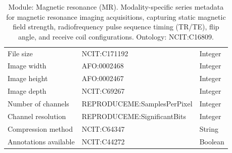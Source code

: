 \documentclass{article}
\begin{document}
\begin{table}[htb]
\begin{tabular}{lll}
File size & NCIT:C171192 & Integer \\
Image width & AFO:0002468 & Integer \\
Image height & AFO:0002467 & Integer \\
Image depth & NCIT:C69267 & Integer \\
Number of channels & REPRODUCEME:SamplesPerPixel & Integer \\
Channel resolution & REPRODUCEME:SignificantBits & Integer \\
Compression method & NCIT:C64347 & String \\
Annotations available & NCIT:C44272 & Boolean \\
\hline
\end{tabular}
\caption[Module: Magnetic resonance (MR)]{\label{table:table17} Module: Magnetic resonance (MR). Modality-specific series metadata for magnetic resonance imaging acquisitions, capturing static magnetic field strength, radiofrequency pulse sequence timing (TR/TE), flip angle, and receive coil configurations. Ontology: NCIT:C16809. }
\end{table}
\end{document}

